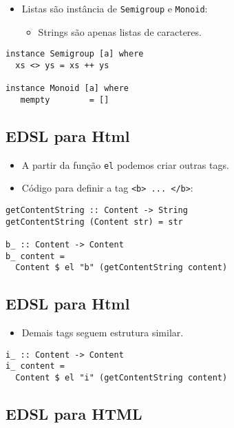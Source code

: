 \documentclass[11pt]{article}
\begin{document}
\begin{itemize}
\item Listas são instância de \texttt{Semigroup} e \texttt{Monoid}:
\begin{itemize}
\item Strings são apenas listas de caracteres.
\end{itemize}
\end{itemize}

\begin{verbatim}
instance Semigroup [a] where
  xs <> ys = xs ++ ys

instance Monoid [a] where
   mempty        = []
\end{verbatim}
\subsection*{EDSL para Html}
\label{sec:org2073b86}

\begin{itemize}
\item A partir da função \texttt{el} podemos criar outras tags.

\item Código para definir a tag \texttt{<b> ... </b>}:
\end{itemize}

\begin{verbatim}
getContentString :: Content -> String
getContentString (Content str) = str

b_ :: Content -> Content
b_ content =
  Content $ el "b" (getContentString content)
\end{verbatim}
\subsection*{EDSL para Html}
\label{sec:org22b508c}

\begin{itemize}
\item Demais tags seguem estrutura similar.
\end{itemize}

\begin{verbatim}
i_ :: Content -> Content
i_ content =
  Content $ el "i" (getContentString content)
\end{verbatim}
\subsection*{EDSL para HTML}
\label{sec:org1a65271}
\end{document}

